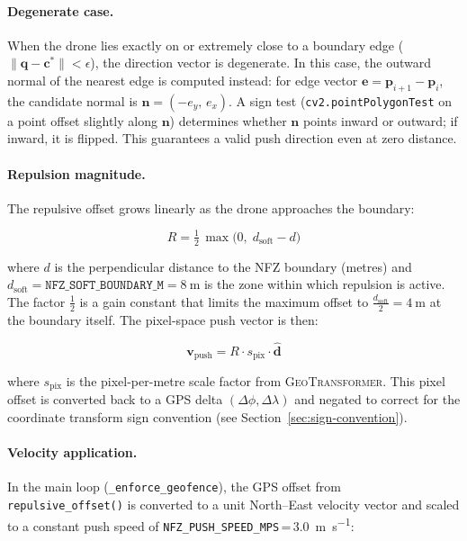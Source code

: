 \paragraph{Degenerate case.}
When the drone lies exactly on or extremely close to a boundary edge ($\|\mathbf{q} - \mathbf{c}^*\| < \epsilon$), the direction vector is degenerate. In this case, the outward normal of the nearest edge is computed instead: for edge vector $\mathbf{e} = \mathbf{p}_{i+1} - \mathbf{p}_i$, the candidate normal is $\mathbf{n} = (-e_y,\, e_x)$. A sign test (\texttt{cv2.pointPolygonTest} on a point offset slightly along $\mathbf{n}$) determines whether $\mathbf{n}$ points inward or outward; if inward, it is flipped. This guarantees a valid push direction even at zero distance.

\paragraph{Repulsion magnitude.}
The repulsive offset grows linearly as the drone approaches the boundary:

\begin{equation}\label{eq:repulsion}
  R = \tfrac{1}{2}\,\max\!\bigl(0,\; d_{\text{soft}} - d\bigr)
\end{equation}

\noindent where $d$ is the perpendicular distance to the NFZ boundary (metres) and $d_{\text{soft}} = \texttt{NFZ\_SOFT\_BOUNDARY\_M} = \SI{8}{\metre}$ is the zone within which repulsion is active. The factor $\frac{1}{2}$ is a gain constant that limits the maximum offset to $\frac{d_{\text{soft}}}{2} = \SI{4}{\metre}$ at the boundary itself. The pixel-space push vector is then:

\begin{equation}\label{eq:push-vector}
  \mathbf{v}_{\text{push}} = R \cdot s_{\text{pix}} \cdot \hat{\mathbf{d}}
\end{equation}

\noindent where $s_{\text{pix}}$ is the pixel-per-metre scale factor from \textsc{GeoTransformer}. This pixel offset is converted back to a GPS delta $(\Delta\phi, \Delta\lambda)$ and negated to correct for the coordinate transform sign convention (see Section~\ref{sec:sign-convention}).

\paragraph{Velocity application.}
In the main loop (\texttt{\_enforce\_geofence}), the GPS offset from \texttt{repulsive\_offset()} is converted to a unit North--East velocity vector and scaled to a constant push speed of \texttt{NFZ\_PUSH\_SPEED\_MPS}\,=\,\SI{3.0}{\metre\per\second}:

